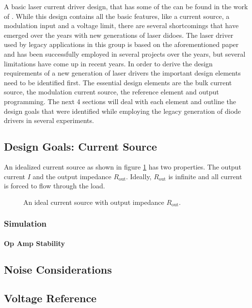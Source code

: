 A basic laser current driver design, that has some of the  can be found in the work of \citeauthor{libbrecht_hall} \cite{libbrecht_hall}. While this design contains all the basic features, like a current source, a modulation input and a voltage limit, there are several shortcomings that have emerged over the years with new generations of laser didoes. The laser driver used by legacy applications in this group is based on the aforementioned paper and has been successfully employed in several projects over the years, but several limitations have come up in recent years. In order to derive the design requirements of a new generation of laser drivers the important design elements need to be identified first. The essential design elements are the bulk current source, the modulation current source, the reference element and output programming. The next 4 sections will deal with each element and outline the design goals that were identified while employing the legacy generation of diode drivers in several experiments.

\subsection{Design Goals: Current Source}
An idealized current source as shown in figure \ref{fig:ideal_current_source} has two properties. The output current $I$ and the output impedance $R_\mathrm{out}$. Ideally, $R_\mathrm{out}$ is infinite and all current is forced to flow through the load.

\begin{figure}[ht]
    \centering
    \caption{An ideal current source with output impedance $R_\mathrm{out}$.}
    \label{fig:ideal_current_source}
\end{figure}

\subsubsection{Simulation}
\paragraph{Op Amp Stability}
\subsection{Noise Considerations}
\subsection{Voltage Reference}
